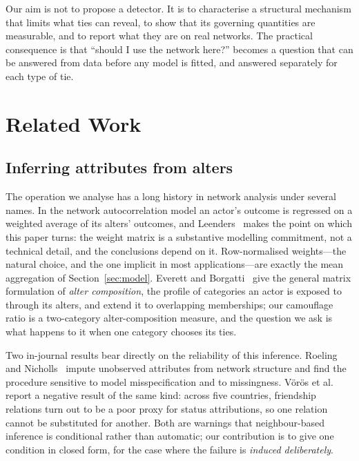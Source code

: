 \documentclass[onecolumn,pdflatex,sn-basic,Numbered]{sn-jnl}
\theoremstyle{thmstyleone}
\theoremstyle{thmstylethree}
\begin{document}
Our aim is not to propose a detector. It is to characterise a structural mechanism
that limits what ties can reveal, to show that its governing quantities are
measurable, and to report what they are on real networks. The practical consequence is
that ``should I use the network here?'' becomes a question that can be answered from
data before any model is fitted, and answered separately for each type of tie.



\section{Related Work}
\label{sec:related}

\subsection{Inferring attributes from alters}
\label{sec:related-alters}

The operation we analyse has a long history in network analysis under several names.
In the network autocorrelation model an actor's outcome is regressed on a weighted
average of its alters' outcomes, and Leenders~\citep{leenders2002modeling} makes the
point on which this paper turns: the weight matrix is a substantive modelling
commitment, not a technical detail, and the conclusions depend on it. Row-normalised
weights---the natural choice, and the one implicit in most applications---are exactly
the mean aggregation of Section~\ref{sec:model}. Everett and
Borgatti~\citep{everett2026alter} give the general matrix formulation of \emph{alter
composition}, the profile of categories an actor is exposed to through its alters,
and extend it to overlapping memberships; our camouflage ratio is a two-category
alter-composition measure, and the question we ask is what happens to it when one
category chooses its ties.

Two in-journal results bear directly on the reliability of this inference.
Roeling and Nicholls~\citep{roeling2020imputation} impute unobserved attributes from
network structure and find the procedure sensitive to model misspecification and to
missingness. V\"or\"os et al.~\citep{voros2019limits} report a negative result of the
same kind: across five countries, friendship relations turn out to be a poor proxy
for status attributions, so one relation cannot be substituted for another. Both are
warnings that neighbour-based inference is conditional rather than automatic; our
contribution is to give one condition in closed form, for the case where the failure
is \emph{induced deliberately}.
\end{document}
